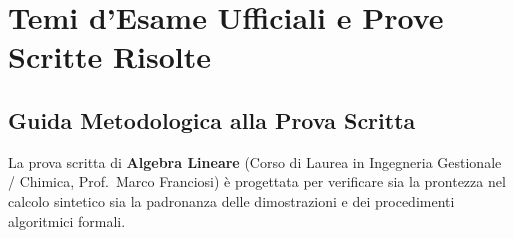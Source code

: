
\chapter{Temi d'Esame Ufficiali e Prove Scritte Risolte}
\label{chap:esercizi_esami}

\section{Guida Metodologica alla Prova Scritta}

La prova scritta di \textbf{Algebra Lineare} (Corso di Laurea in Ingegneria Gestionale / Chimica, Prof.~Marco Franciosi) è progettata per verificare sia la prontezza nel calcolo sintetico sia la padronanza delle dimostrazioni e dei procedimenti algoritmici formali.

